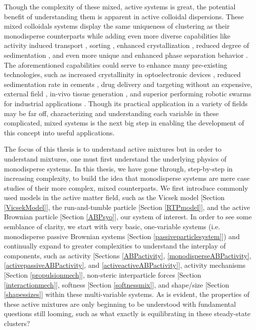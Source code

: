 \documentclass[11pt]{article}
\begin{document}
Though the complexity of these mixed, active systems is great, the potential benefit of understanding them is apparent in active colloidal dispersions.  These mixed colloidals systems display the same uniqueness of clustering as their monodisperse counterparts while adding even more diverse capabilities like activity induced transport \cite{Ghosh}, sorting \cite{Chen5}, enhanced crystallization \cite{Meer}, reduced degree of sedimentation \cite{Palacci4}, and even more unique and enhanced phase separation behavior \cite{Kolb}.  The aforementioned capabilities could serve to enhance many pre-existing technologies, such as increased crystallinity in optoelectronic devices \cite{Meer, Castro}, reduced sedimentation rate in cements \cite{Palacci4}, drug delivery and targeting without an expensive, external field \cite{Ghosh6}, in-vivo tissue generation \cite{Patterson}, and superior performing robotic swarms for industrial applications \cite{Brambilla}.  Though its practical application in a variety of fields may be far off, characterizing and understanding each variable in these complicated, mixed systems is the next big step in enabling the development of this concept into useful applications.

 The focus of this thesis is to understand active mixtures but in order to understand mixtures, one must first understand the underlying physics of monodisperse systems. In this thesis, we have gone through, step-by-step in increasing complexity, to build the idea that monodisperse systems are mere case studies of their more complex, mixed counterparts. We first introduce commonly used models in the active matter field, such as the Vicsek model [Section \ref{VicsekModel}], the run-and-tumble particle [Section \ref{RTPmodel}], and the active Brownian particle [Section \ref{ABPsyo}], our system of interest. In order to see some semblance of clarity, we start with very basic, one-variable systems (i.e. monodisperse passive Brownian systems [Section \ref{passiveparticlesystem}]) and continually expand to greater complexities to understand the interplay of components, such as activity [Sections \ref{ABPactivity}, \ref{monodisperseABPactivity}, \ref{activepassiveABPactivity}, and \ref{activeactiveABPactivity}], activity mechanisms [Section \ref{propulsionmech}], non-steric interparticle forces [Section \ref{interactionmech}], softness [Section \ref{softnessmix}], and shape/size [Section \ref{shapessizes}] within these multi-variable systems.  As is evident, the properties of these active mixtures are only beginning to be understood with fundamental questions still looming, such as what exactly is equilibrating in these steady-state clusters?  
\end{document}
